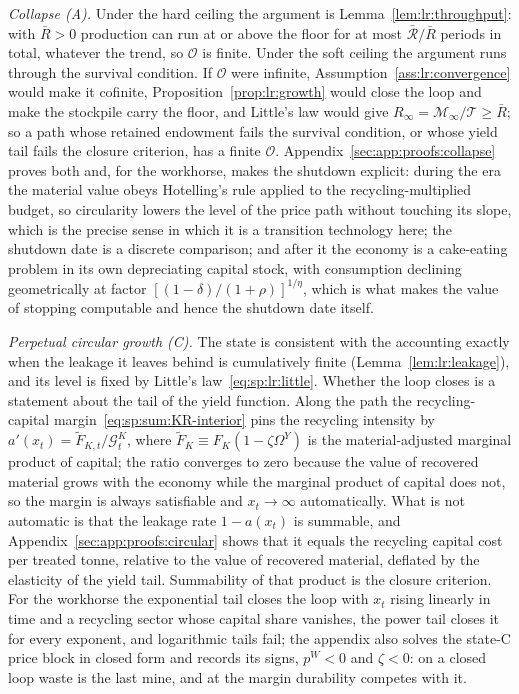 \emph{Collapse (A).} Under the hard ceiling the argument is Lemma~\ref{lem:lr:throughput}: with $\bar R>0$ production can run at or above the floor for at most $\bar{\mathcal R}/\bar R$ periods in total, whatever the trend, so $\mathcal O$ is finite. Under the soft ceiling the argument runs through the survival condition. If $\mathcal O$ were infinite, Assumption~\ref{ass:lr:convergence} would make it cofinite, Proposition~\ref{prop:lr:growth} would close the loop and make the stockpile carry the floor, and Little's law would give $R_\infty=\mathcal M_\infty/\mathcal T\ge\bar R$; so a path whose retained endowment fails the survival condition, or whose yield tail fails the closure criterion, has a finite $\mathcal O$. Appendix~\ref{sec:app:proofs:collapse} proves both and, for the workhorse, makes the shutdown explicit: during the era the material value obeys Hotelling's rule applied to the recycling-multiplied budget, so circularity lowers the level of the price path without touching its slope, which is the precise sense in which it is a transition technology here; the shutdown date is a discrete comparison; and after it the economy is a cake-eating problem in its own depreciating capital stock, with consumption declining geometrically at factor $\left[\left(1-\delta\right)/\left(1+\rho\right)\right]^{1/\eta}$, which is what makes the value of stopping computable and hence the shutdown date itself.

\emph{Perpetual circular growth (C).} The state is consistent with the accounting exactly when the leakage it leaves behind is cumulatively finite (Lemma~\ref{lem:lr:leakage}), and its level is fixed by Little's law~\eqref{eq:sp:lr:little}. Whether the loop closes is a statement about the tail of the yield function. Along the path the recycling-capital margin~\eqref{eq:sp:sum:KR-interior} pins the recycling intensity by $a'\left(x_t\right)=\tilde F_{K,t}/\mathcal G^K_t$, where $\tilde F_K\equiv F_K\left(1-\zeta\Omega^Y\right)$ is the material-adjusted marginal product of capital; the ratio converges to zero because the value of recovered material grows with the economy while the marginal product of capital does not, so the margin is always satisfiable and $x_t\to\infty$ automatically. What is not automatic is that the leakage rate $1-a\left(x_t\right)$ is summable, and Appendix~\ref{sec:app:proofs:circular} shows that it equals the recycling capital cost per treated tonne, relative to the value of recovered material, deflated by the elasticity of the yield tail. Summability of that product is the closure criterion. For the workhorse the exponential tail closes the loop with $x_t$ rising linearly in time and a recycling sector whose capital share vanishes, the power tail closes it for every exponent, and logarithmic tails fail; the appendix also solves the state-C price block in closed form and records its signs, $p^W<0$ and $\zeta<0$: on a closed loop waste is the last mine, and at the margin durability competes with it.

